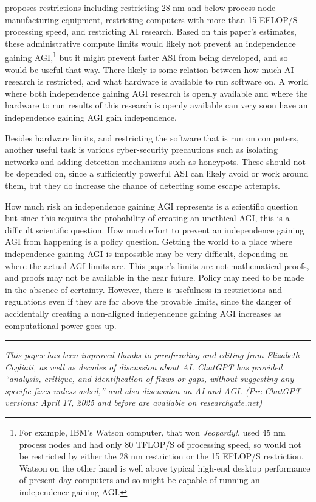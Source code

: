 \documentclass[letterpaper,twocolumn]{article}
\begin{document}
\cite{ifanyonebuildsittreaty} proposes restrictions including
restricting 28 nm and below process node manufacturing equipment,
restricting computers with more than 15 EFLOP/S processing speed, and
restricting AI research. Based on this paper's estimates, these
administrative compute limits would likely not prevent an independence
gaining AGI,\footnote{For example, IBM's Watson computer, that won
{\em Jeopardy!}, used 45 nm process nodes and had only 80 TFLOP/S of
processing speed, so would not be restricted by either the 28 nm
restriction or the 15 EFLOP/S restriction. Watson on the other hand is
well above typical high-end desktop performance of present day
computers and so might be capable of running an independence gaining
AGI.} but it might prevent faster ASI from being developed, and so
would be useful that way. There likely is some relation between how
much AI research is restricted, and what hardware is available to run
software on. A world where both independence gaining AGI research is
openly available and where the hardware to run results of this
research is openly available can very soon have an independence
gaining AGI gain independence.

Besides hardware limits, and restricting the software that is run on
computers, another useful task is various cyber-security precautions
such as isolating networks and adding detection mechanisms such as
honeypots. These should not be depended on, since a sufficiently
powerful ASI can likely avoid or work around them, but they do
increase the chance of detecting some escape attempts.

How much risk an independence gaining AGI represents is a scientific
question but since this requires the probability of creating an
unethical AGI, this is a difficult scientific question. How much
effort to prevent an independence gaining AGI from happening is a
policy question.  Getting the world to a place where independence
gaining AGI is impossible may be very difficult, depending on where
the actual AGI limits are. This paper's limits are not mathematical
proofs, and proofs may not be available in the near future. Policy may
need to be made in the absence of certainty. However, there is
usefulness in restrictions and regulations even if they are far above
the provable limits, since the danger of accidentally creating a
non-aligned independence gaining AGI increases as computational power
goes up.

\rule{0.9\linewidth}{.1pt}

\emph{This paper has been improved thanks to proofreading and editing
from Elizabeth Cogliati, as well as decades of discussion about AI.
ChatGPT has provided ``analysis, critique, and identification of flaws
or gaps, without suggesting any specific fixes unless asked,'' and
also discussion on AI and AGI.  (Pre-ChatGPT versions: April 17, 2025
and before are available on researchgate.net)}
\end{document}
